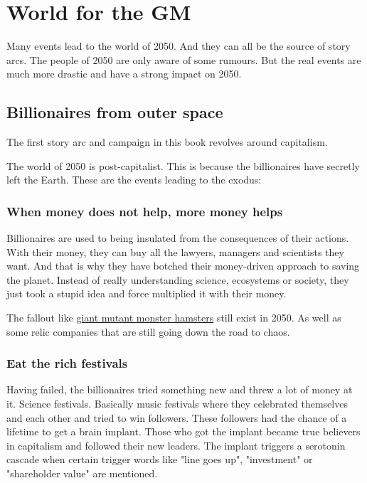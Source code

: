 \chapter{World for the GM}

Many events lead to the world of 2050. And they can all be the source of story arcs. The people of 2050 are only aware of some rumours. But the real events are much more drastic and have a strong impact on 2050.

\section{Billionaires from outer space}
\label{sec:Billionaires from outer space}

The first story arc and campaign in this book revolves around capitalism.

The world of 2050 is post-capitalist. This is because the billionaires have secretly left the Earth. These are the events leading to the exodus:

\subsection{When money does not help, more money helps}

Billionaires are used to being insulated from the consequences of their actions. With their money, they can buy all the lawyers, managers and scientists they want. And that is why they have botched their money-driven approach to saving the planet. Instead of really understanding science, ecosystems or society, they just took a stupid idea and force multiplied it with their money.

The fallout like \hyperref[ch:the world destroying machine]{giant mutant monster hamsters} still exist in 2050. As well as some relic companies that are still going down the road to chaos.

\subsection{Eat the rich festivals}

Having failed, the billionaires tried something new and threw a lot of money at it. Science festivals. Basically music festivals where they celebrated themselves and each other and tried to win followers. These followers had the chance of a lifetime to get a brain implant.
Those who got the implant became true believers in capitalism and followed their new leaders. The implant triggers a serotonin cascade when certain trigger words like "line goes up", "investment" or "shareholder value" are mentioned.

